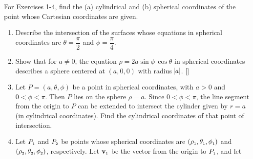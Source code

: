 \section*{}
\par\noindent For Exercises 1-4, find the (a) cylindrical and (b) spherical coordinates of the point whose
Cartesian coordinates are given.
\begin{enumerate}
\par\noindent For Exercises 5-7, write the given equation in (a) cylindrical and (b) spherical coordinates.
[{}]
\vspace{1mm}
[{}]
 \item Describe the intersection of the surfaces whose equations in spherical coordinates are $\theta = \dfrac{\pi}{2}$
  and $\phi = \dfrac{\pi}{4}$.
 \item Show that for $a \ne 0$, the equation $\rho = 2a \sin \phi \, \cos \theta$ in spherical coordinates describes a
  sphere centered at $(a,0,0)$ with radius $\abs{a}$.
[{}]
 \item Let $P = (a,\theta,\phi)$ be a point in spherical coordinates, with $a > 0$ and $0 < \phi < \pi$. Then $P$ lies
  on the sphere $\rho = a$. Since $0 < \phi < \pi$, the line segment from the origin to $P$
  can be extended to intersect the cylinder given by $r = a$ (in cylindrical coordinates). Find the cylindrical
  coordinates of that point of intersection.
 \item Let $P_{\scriptscriptstyle 1}$ and $P_{\scriptscriptstyle 2}$ be points whose spherical coordinates are
  $( \rho_{\scriptscriptstyle 1},\theta_{\scriptscriptstyle 1},\phi_{\scriptscriptstyle 1} )$ and $( \rho_{\scriptscriptstyle 2},\theta_{\scriptscriptstyle 2},\phi_{\scriptscriptstyle 2} )$,
  respectively. Let $\textbf{v}_{\scriptscriptstyle 1}$ be the vector from the origin to $P_{\scriptscriptstyle 1}$, and let

\end{enumerate}
